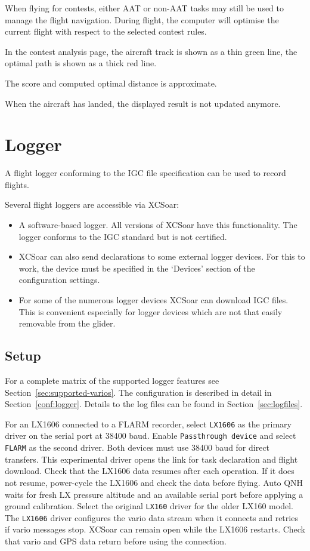 When flying for contests, either AAT or non-AAT tasks may still be used to
manage the flight navigation.  During flight, the computer will optimise the
current flight with respect to the selected contest rules.

In the contest analysis page, the aircraft track is shown as a thin green line, the optimal
path is shown as a thick red line.

The score and computed optimal distance is approximate.

When the aircraft has landed, the displayed result is not updated anymore.


\section{Logger}\label{sec:logger}

A flight logger conforming to the IGC file specification can be used
to record flights.

Several flight loggers are accessible via XCSoar:
\begin{itemize}
\item A software-based logger.  All versions of XCSoar have this
  functionality.  The logger conforms to the IGC standard but is not
  certified.
\item XCSoar can also send declarations to some external logger devices.
  For this to work, the device must be specified in the `Devices'
  section of the configuration  settings.
\item  For some of the numerous logger devices XCSoar can download IGC files.
  This is convenient especially for logger devices which are not that easily
  removable from the glider.
\end{itemize}

\subsection*{Setup}
For a complete matrix of the supported logger features see Section~\ref{sec:supported-varios}.
The configuration is described in detail in Section~\ref{conf:logger}.  Details
to the log files can be found in Section~\ref{sec:logfiles}.

For an LX1606 connected to a FLARM recorder, select \texttt{LX1606}
as the primary driver on the serial port at 38400 baud. Enable
\texttt{Passthrough device} and select \texttt{FLARM} as the second
driver. Both devices must use 38400 baud for direct transfers. This
experimental driver opens the link for task declaration and flight
download. Check that the LX1606 data resumes after each operation.
If it does not resume, power-cycle the LX1606 and check the data
before flying. Auto QNH waits for fresh LX pressure altitude and an
available serial port before applying a ground calibration.
Select the original \texttt{LX160} driver for the older LX160 model.
The \texttt{LX1606} driver configures the vario data stream when it
connects and retries if vario messages stop. XCSoar can remain open
while the LX1606 restarts. Check that vario and GPS data return before
using the connection.

